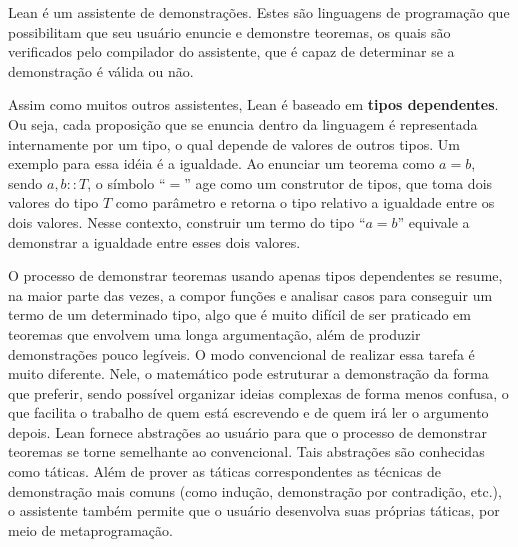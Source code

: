 \documentclass[12pt, oneside, a4paper,english,brazil]{abntex2}
\begin{document}
\qquad Lean\cite{2} \'e um assistente de demonstra\c{c}\~oes. Estes s\~ao linguagens de programa\c{c}\~ao que
possibilitam que seu usu\'ario enuncie e demonstre teoremas, os quais s\~ao verificados pelo compilador do
assistente, que \'e capaz de determinar se a demonstra\c{c}\~ao \'e v\'alida ou n\~ao.

\qquad Assim como muitos outros assistentes, Lean \'e baseado em \textbf{tipos
  dependentes}\cite{typesAtWork}. Ou seja, cada proposi\c{c}\~ao que se enuncia dentro da linguagem \'e
representada internamente por um tipo, o qual depende de valores de outros tipos. Um exemplo para essa
id\'eia \'e a igualdade. Ao enunciar um teorema como $a = b$, sendo $a, b :: T$, o s\'imbolo ``$=$'' age como
um construtor de tipos, que toma dois valores do tipo $T$ como par\^ametro e retorna o tipo relativo a
igualdade entre os dois valores. Nesse contexto, construir um termo do tipo ``$a = b$'' equivale a demonstrar
a igualdade entre esses dois valores.

\qquad O processo de demonstrar teoremas usando apenas tipos dependentes se resume, na maior parte das vezes, a compor fun\c{c}\~oes e analisar casos para conseguir um termo de um determinado tipo, algo que \'e muito dif\'icil de ser praticado em teoremas que envolvem uma longa argumenta\c{c}\~ao, al\'em de produzir demonstra\c{c}\~oes pouco leg\'iveis. O modo convencional de realizar essa tarefa \'e muito diferente. Nele,
o matem\'atico pode estruturar a demonstra\c{c}\~ao da forma que preferir, sendo poss\'ivel organizar
ideias complexas de forma menos confusa, o que facilita o trabalho de quem est\'a escrevendo e de quem ir\'a
ler o argumento depois.
Lean fornece abstra\c{c}\~oes ao usu\'ario para que o processo de demonstrar teoremas se torne semelhante ao
convencional. Tais abstra\c{c}\~oes s\~ao conhecidas como t\'aticas. Al\'em de prover as t\'aticas
correspondentes as t\'ecnicas de demonstra\c{c}\~ao mais comuns (como indu\c{c}\~ao, demonstra\c{c}\~ao por contradi\c{c}\~ao, etc.), o assistente tamb\'em permite que o usu\'ario desenvolva suas pr\'oprias t\'aticas, por meio de metaprograma\c{c}\~ao\cite{metaprog}.
\end{document}
